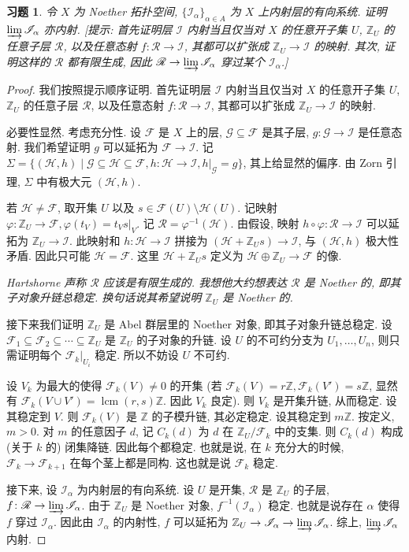 \documentclass{article}
\theoremstyle{exercise}
\newtheorem{exercise}{习题}[section]
\theoremstyle{theorem}
\theoremstyle{remark}
\def\Z{\mathbb{Z}}
\def\cF{\mathscr{F}}
\def\cG{\mathscr{G}}
\def\cH{\mathscr{H}}
\def\cI{\mathscr{I}}
\def\cR{\mathscr{R}}
\begin{document}
\begin{exercise}
  令 $X$ 为 Noether 拓扑空间, $\{\cI_\alpha\}_{\alpha \in A}$ 为 $X$ 上内射层的有向系统. 证明 $\varinjlim \cI_\alpha$ 亦内射.
  [\emph{提示:} 首先证明层 $\cI$ 内射当且仅当对 $X$ 的任意开子集 $U$, $\Z_U$ 的任意子层 $\cR$, 以及任意态射 $f \colon \cR \to \cI$,
  其都可以扩张成 $\Z_U \to \cI$ 的映射.
  其次, 证明这样的 $\cR$ 都有限生成, 因此 $\cR \to \varinjlim \cI_\alpha$ 穿过某个 $\cI_\alpha$.]
\end{exercise}

\begin{proof}
  我们按照提示顺序证明. 首先证明层 $\cI$ 内射当且仅当对 $X$ 的任意开子集 $U$, $\Z_U$ 的任意子层 $\cR$, 以及任意态射 $f \colon \cR \to \cI$,
  其都可以扩张成 $\Z_U \to \cI$ 的映射.

  必要性显然. 考虑充分性. 设 $\cF$ 是 $X$ 上的层, $\cG \subseteq \cF$ 是其子层, $g \colon \cG \to \cI$ 是任意态射.
  我们希望证明 $g$ 可以延拓为 $\cF \to \cI$.
  记 $\Sigma = \{ (\cH, h) \mid \cG \subseteq \cH \subseteq \cF, h \colon \cH \to \cI, h|_{\cG} = g \}$,
  其上给显然的偏序. 由 Zorn 引理, $\Sigma$ 中有极大元 $(\cH, h)$.

  若 $\cH \neq \cF$, 取开集 $U$ 以及 $s \in \cF(U) \setminus \cH(U)$.
  记映射 $\varphi \colon \Z_U \to \cF, \varphi(t_V) = t_Vs|_V$. 记 $\cR = \varphi^{-1}(\cH)$.
  由假设, 映射 $h \circ \varphi \colon \cR \to \cI$ 可以延拓为 $\Z_U \to \cI$.
  此映射和 $h \colon \cH \to \cI$ 拼接为 $(\cH + \Z_Us) \to \cI$, 与 $(\cH, h)$ 极大性矛盾. 因此只可能 $\cH = \cF$.
  这里 $\cH + \Z_Us$ 定义为 $\cH \oplus \Z_U \to \cF$ 的像.

  \emph{Hartshorne 声称 $\cR$ 应该是有限生成的. 我想他大约想表达 $\cR$ 是 Noether 的, 即其子对象升链总稳定. 换句话说其希望说明 $\Z_U$ 是 Noether 的.}

  接下来我们证明 $\Z_U$ 是 Abel 群层里的 Noether 对象, 即其子对象升链总稳定.
  设 $\cF_1 \subseteq \cF_2 \subseteq \cdots \subseteq \Z_U$ 是 $\Z_U$ 的子对象的升链.
  设 $U$ 的不可约分支为 $U_1, \dots, U_n$, 则只需证明每个 $\cF_k|_{U_i}$ 稳定. 所以不妨设 $U$ 不可约.

  设 $V_k$ 为最大的使得 $\cF_k(V) \neq 0$ 的开集 (若 $\cF_k(V) = r\Z, \cF_k(V') = s\Z$, 显然有 $\cF_k(V \cup V') = \operatorname{lcm}(r, s)\Z$. 因此 $V_k$ 良定).
  则 $V_k$ 是开集升链, 从而稳定. 设其稳定到 $V$.
  则 $\cF_k(V)$ 是 $\Z$ 的子模升链, 其必定稳定.
  设其稳定到 $m\Z$. 按定义, $m > 0$.
  对 $m$ 的任意因子 $d$, 记 $C_k(d)$ 为 $d$ 在 $\Z_U / \cF_k$ 中的支集. 则 $C_k(d)$ 构成 (关于 $k$ 的) 闭集降链.
  因此每个都稳定. 也就是说, 在 $k$ 充分大的时候, $\cF_k \to \cF_{k+1}$ 在每个茎上都是同构. 这也就是说 $\cF_k$ 稳定.

  接下来, 设 $\cI_\alpha$ 为内射层的有向系统. 设 $U$ 是开集, $\cR$ 是 $\Z_U$ 的子层, $f \colon \cR \to \varinjlim \cI_\alpha$.
  由于 $\Z_U$ 是 Noether 对象, $f^{-1}(\cI_\alpha)$ 稳定. 也就是说存在 $\alpha$ 使得 $f$ 穿过 $\cI_\alpha$.
  因此由 $\cI_\alpha$ 的内射性, $f$ 可以延拓为 $\Z_U \to \cI_\alpha \to \varinjlim \cI_\alpha$. 综上, $\varinjlim \cI_\alpha$ 内射.
\end{proof}
\end{document}
